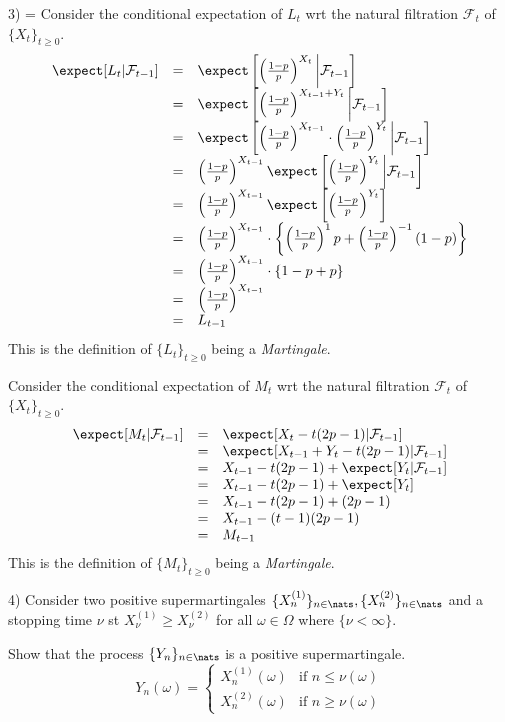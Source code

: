 \documentclass[11pt,a4paper]{article}
\begin{document}
\begin{answer}{3)}
  \everymath={\displaystyle}
  Consider the conditional expectation of $L_t$ wrt the natural filtration $\mathcal{F}_t$ of $\{X_t\}_{t\geq0}$.
  \[\begin{array}{rcl}
    \expect[L_t|\mathcal{F}_{t-1}]&=&\expect\left[\left(\frac{1-p}p\right)^{X_t}\bigg|\mathcal{F}_{t-1}\right]\\
    &=&\expect\left[\left(\frac{1-p}p\right)^{X_{t-1}+Y_t}\bigg|\mathcal{F}_{t-1}\right]\\
    &=&\expect\left[\left(\frac{1-p}p\right)^{X_{t-1}}\cdot\left(\frac{1-p}p\right)^{Y_t}\bigg|\mathcal{F}_{t-1}\right]\\
    &=&\left(\frac{1-p}p\right)^{X_{t-1}}\expect\left[\left(\frac{1-p}p\right)^{Y_t}\bigg|\mathcal{F}_{t-1}\right]\\
    &=&\left(\frac{1-p}p\right)^{X_{t-1}}\expect\left[\left(\frac{1-p}p\right)^{Y_t}\right]\\
    &=&\left(\frac{1-p}p\right)^{X_{t-1}}\cdot\left\{\left(\frac{1-p}p\right)^1p+\left(\frac{1-p}p\right)^{-1}(1-p)\right\}\\
    &=&\left(\frac{1-p}p\right)^{X_{t-1}}\cdot\left\{1-p+p\right\}\\
    &=&\left(\frac{1-p}p\right)^{X_{t-1}}\\
    &=&L_{t-1}
  \end{array}\]
  This is the definition of $\{L_t\}_{t\geq0}$ being a \textit{Martingale}.
  \par Consider the conditional expectation of $M_t$ wrt the natural filtration $\mathcal{F}_t$ of $\{X_t\}_{t\geq0}$.
  \[\begin{array}{rcl}
    \expect[M_t|\mathcal{F}_{t-1}]&=&\expect[X_t-t(2p-1)|\mathcal{F}_{t-1}]\\
    &=&\expect[X_{t-1}+Y_t-t(2p-1)|\mathcal{F}_{t-1}]\\
    &=&X_{t-1}-t(2p-1)+\expect[Y_t|\mathcal{F}_{t-1}]\\
    &=&X_{t-1}-t(2p-1)+\expect[Y_t]\\
    &=&X_{t-1}-t(2p-1)+(2p-1)\\
    &=&X_{t-1}-(t-1)(2p-1)\\
    &=&M_{t-1}
  \end{array}\]
  This is the definition of $\{M_t\}_{t\geq0}$ being a \textit{Martingale}.
\end{answer}

\begin{question}{4)}
  Consider two  positive supermartingales $\{X_n^{(1)}\}_{n\in\nats},\{X_n^{(2)}\}_{n\in\nats}$ and a stopping time $\nu$ st $X_\nu^{(1)}\geq X_\nu^{(2)}$ for all $\omega\in\Omega$ where $\{\nu<\infty\}$.
  \par Show that the process $\{Y_n\}_{n\in\nats}$ is a positive supermartingale.
  \[ Y_n(\omega)=\begin{cases}
    X_n^{(1)}(\omega)&\text{if }n\leq\nu(\omega)\\
    X_n^{(2)}(\omega)&\text{if }n\geq\nu(\omega)
  \end{cases} \]
\end{question}
\end{document}
